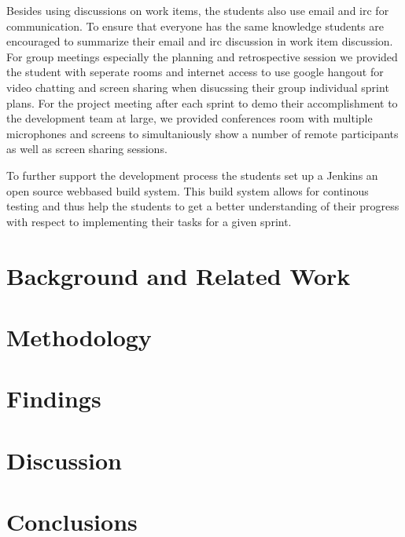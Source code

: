Besides using discussions on work items, the students also use email and irc for communication.
To ensure that everyone has the same knowledge students are encouraged to summarize their email and irc discussion in work item discussion.
For group meetings especially the planning and retrospective session we provided the student with seperate rooms and internet access to use google hangout for video chatting and screen sharing when disucssing their group individual sprint plans.
For the project meeting after each sprint to demo their accomplishment to the development team at large, we provided conferences room with multiple microphones and screens to simultaniously show a number of remote participants as well as screen sharing sessions. 

To further support the development process the students set up a Jenkins an open source webbased build system.
This build system allows for continous testing and thus help the students to get a better understanding of their progress with respect to implementing their tasks for a given sprint.

\section{Background and Related Work}
\section{Methodology}
\section{Findings}
\section{Discussion}
\section{Conclusions}
